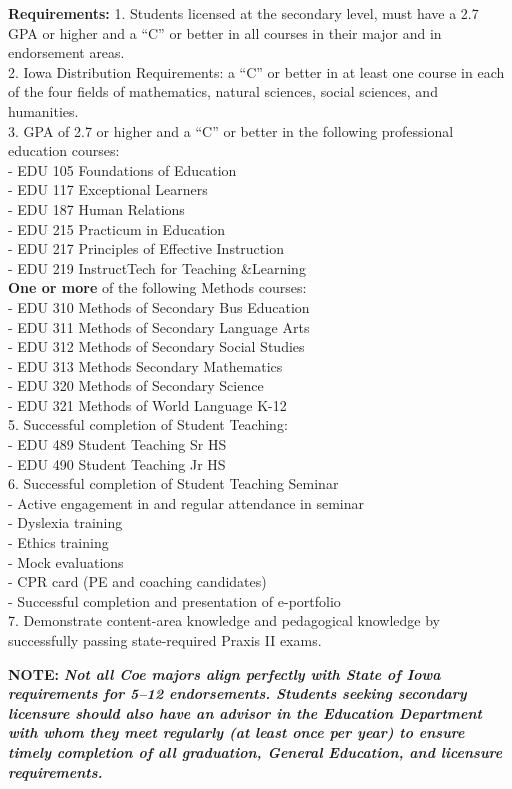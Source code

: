 \documentclass[
  letterpaper,
]{scrbook}
\begin{document}
\textbf{Requirements:} 1. Students licensed at the secondary level, must
have a 2.7 GPA or higher and a ``C'' or better in all courses in their
major and in endorsement areas.\\
2. Iowa Distribution Requirements: a ``C'' or better in at least one
course in each of the four fields of mathematics, natural sciences,
social sciences, and humanities.\\
3. GPA of 2.7 or higher and a ``C'' or better in the following
professional education courses:\\
- EDU 105 Foundations of Education\\
- EDU 117 Exceptional Learners\\
- EDU 187 Human Relations\\
- EDU 215 Practicum in Education\\
- EDU 217 Principles of Effective Instruction\\
- EDU 219 InstructTech for Teaching \&Learning\\
\textbf{One or more} of the following Methods courses:\\
- EDU 310 Methods of Secondary Bus Education\\
- EDU 311 Methods of Secondary Language Arts\\
- EDU 312 Methods of Secondary Social Studies\\
- EDU 313 Methods Secondary Mathematics\\
- EDU 320 Methods of Secondary Science\\
- EDU 321 Methods of World Language K-12\\
5. Successful completion of Student Teaching:\\
- EDU 489 Student Teaching Sr HS\\
- EDU 490 Student Teaching Jr HS\\
6. Successful completion of Student Teaching Seminar\\
- Active engagement in and regular attendance in seminar\\
- Dyslexia training\\
- Ethics training\\
- Mock evaluations\\
- CPR card (PE and coaching candidates)\\
- Successful completion and presentation of e-portfolio\\
7. Demonstrate content-area knowledge and pedagogical knowledge by
successfully passing state-required Praxis II exams.

\textbf{NOTE:} \textbf{\emph{Not all Coe majors align perfectly with
State of Iowa requirements for 5--12 endorsements. Students seeking
secondary licensure should also have an advisor in the Education
Department with whom they meet regularly (at least once per year) to
ensure timely completion of all graduation, General Education, and
licensure requirements.}}
\end{document}
